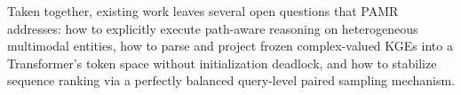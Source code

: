 \documentclass[runningheads]{llncs}
\begin{document}



Taken together, existing work leaves several open questions that PAMR addresses: how to explicitly execute path-aware reasoning on heterogeneous multimodal entities, how to parse and project frozen complex-valued KGEs into a Transformer's token space without initialization deadlock, and how to stabilize sequence ranking via a perfectly balanced query-level paired sampling mechanism.
\end{document}
